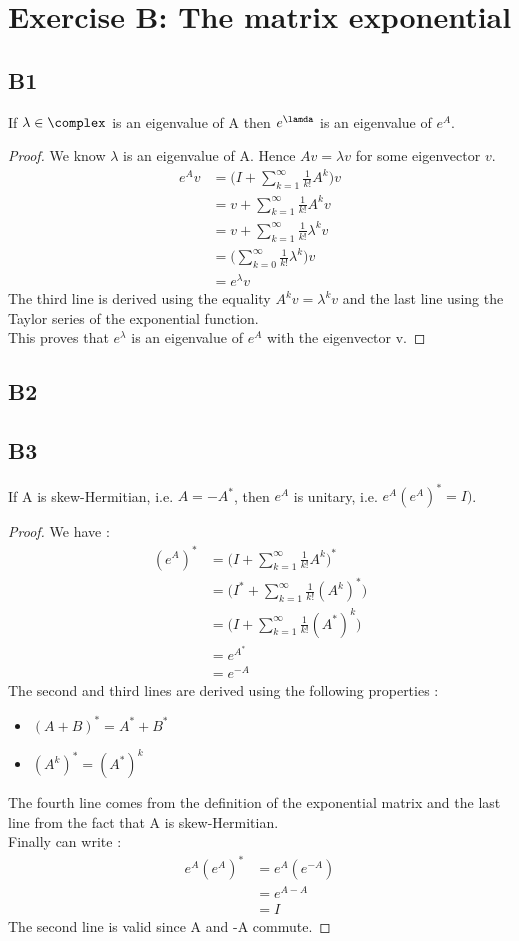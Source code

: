 \documentclass[11pt]{article}
\begin{document}
\section{Exercise B: The matrix exponential}
\subsection*{B1}
If $\lambda\in \complex$ is an eigenvalue of A then $e^\lamda$ is an eigenvalue of $e^A$.
\begin{proof}
We know $\lambda$ is an eigenvalue of A. Hence $Av=\lambda v$ for some eigenvector $v$.
\begin{align*}
    e^Av&=\Bigg(I+\sum^{\infty}_{k=1}\frac{1}{k!}A^k\Bigg)v\\
    &=v+\sum^{\infty}_{k=1}\frac{1}{k!}A^kv\\
    &=v+\sum^{\infty}_{k=1}\frac{1}{k!}\lambda^kv\\
    &=\Bigg(\sum^{\infty}_{k=0}\frac{1}{k!}\lambda^k\Bigg)v\\
    &=e^\lambda v
\end{align*}
The third line is derived using the equality $A^kv=\lambda^kv$ and the last line using the Taylor series of the exponential function.\\
This proves that $e^\lambda$ is an eigenvalue of $e^A$ with the eigenvector v.
\end{proof}

\subsection*{B2}
\subsection*{B3}
If A is skew-Hermitian, i.e. $A=-A^{*}$, then $e^A$ is unitary, i.e. $e^A(e^A)^{*}=I)$.
\begin{proof}
We have :
\begin{align*}
    (e^A)^{*}&=\Bigg(I+\sum^{\infty}_{k=1}\frac{1}{k!}A^k\Bigg)^{*}\\
    &=\Bigg(I^{*}+\sum^{\infty}_{k=1}\frac{1}{k!}(A^k)^{*}\Bigg)\\
    &=\Bigg(I+\sum^{\infty}_{k=1}\frac{1}{k!}(A^{*})^k\Bigg)\\
    &=e^{A^{*}}\\
    &=e^{-A}
\end{align*}
The second and third lines are derived using the following properties :
\begin{itemize}
    \item $(A+B)^{*}=A^{*}+B^{*}$
    \item $(A^k)^*=(A^*)^k$
\end{itemize}
The fourth line comes from the definition of the exponential matrix and the last line from the fact that A is skew-Hermitian.\\
Finally can write :
\begin{align*}
    e^A(e^A)^{*}&=e^A(e^{-A})\\
    &=e^{A-A}\\
    &=I
\end{align*}
The second line is valid since A and -A commute.
\end{proof}
\end{document}
